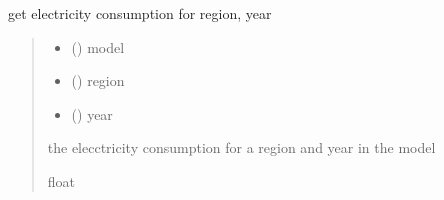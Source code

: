 \documentclass[letterpaper,10pt,english]{sphinxmanual}
\begin{document}
\begin{fulllineitems}
\label{\detokenize{src.models.hydrogen.utilities.h2_functions:src.models.hydrogen.utilities.h2_functions.get_electricty_consumption}}
\pysigstartsignatures
\pysiglinewithargsret
{}
{\sphinxparamcomma {}\sphinxparamcomma {}}
{}
\pysigstopsignatures
\sphinxAtStartPar
get electricity consumption for region, year
\begin{quote}\begin{description}
\begin{itemize}
\item {} 
\sphinxAtStartPar
{} ({\hyperref[\detokenize{src.models.hydrogen.model.h2_model:src.models.hydrogen.model.h2_model.H2Model}]{}}) \textendash{} model

\item {} 
\sphinxAtStartPar
{} () \textendash{} region

\item {} 
\sphinxAtStartPar
{} () \textendash{} year

\end{itemize}

\sphinxAtStartPar
the elecctricity consumption for a region and year in the model

\sphinxAtStartPar
float

\end{description}\end{quote}

\end{fulllineitems}

\end{document}

